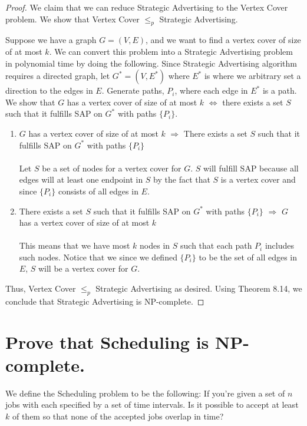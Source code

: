 \documentclass[11pt]{scrartcl}
\begin{document}
\begin{proof}
	We claim that we can reduce Strategic Advertising to the Vertex Cover problem.
	We show that Vertex Cover $\leq_p$ Strategic Advertising.

	Suppose we have a graph $G=(V,E)$, and we want to find a vertex cover of size of at most $k$.
	We can convert this problem into a Strategic Advertising problem in polynomial time by doing the following.
	Since Strategic Advertising algorithm requires a directed graph, let $G^*=(V,E^*)$
	where $E^*$ is where we arbitrary set a direction to the edges in $E$. Generate paths,
	$P_i$, where each edge in $E^*$ is a path.
	We show that $G$ has a vertex cover of size of at most $k$ $\Leftrightarrow$
	there exists a set $S$ such that it fulfills SAP on $G^*$ with paths $\{P_i\}$.

	\begin{enumerate}[label=\roman*.]
		\item {
		      $G$ has a vertex cover of size of at most $k$ $\Rightarrow$
			  There exists a set $S$ such that it fulfills SAP on $G^*$ with paths $\{P_i\}$\\\-\\
			  Let $S$ be a set of nodes for a vertex cover for $G$.
			  $S$ will fulfill SAP because all edges will at least one endpoint in $S$ by the 
			  fact that $S$ is a vertex cover and since $\{P_i\}$ consists of all edges in $E$.
		      }
		\item {
		      There exists a set $S$ such that it fulfills SAP on $G^*$ with paths $\{P_i\}$
			  $\Rightarrow$ $G$ has a vertex cover of size of at most $k$\\\-\\
			  This means that we have most $k$ nodes in $S$ such that each path $P_i$ includes
			  such nodes. Notice that we since we defined $\{P_i\}$ to be the set of all edges in $E$,
			  $S$ will be a vertex cover for $G$.

		      }
	\end{enumerate}
	Thus, Vertex Cover $\leq_p$ Strategic Advertising as desired.
	Using Theorem 8.14, we conclude that Strategic Advertising is NP-complete.
\end{proof}






\pagebreak



\section{
  Prove that Scheduling is NP-complete.
 }
 We define the Scheduling problem to be the following:
 If you’re given a set of $n$ jobs with each specified by a set of time
 intervals. Is it possible to accept at least $k$ of them so that none of the accepted jobs
 overlap in time? 
\end{document}
